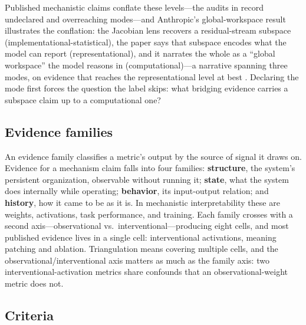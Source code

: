 \documentclass{article}
\begin{document}
Published mechanistic claims conflate these levels---the audits in  record undeclared and overreaching modes---and Anthropic's global-workspace result illustrates the conflation: the Jacobian lens recovers a residual-stream subspace (implementational-statistical), the paper says that subspace encodes what the model can report (representational), and it narrates the whole as a ``global workspace'' the model reasons in (computational)---a narrative spanning three modes, on evidence that reaches the representational level at best \citep{gurnee2026verbalizable}. Declaring the mode first forces the question the label skips: what bridging evidence carries a subspace claim up to a computational one?

\subsection{Evidence families}
\label{sec:evidence-families}

An evidence family classifies a metric's output by the source of signal it draws on. Evidence for a mechanism claim falls into four families: \textbf{structure}, the system's persistent organization, observable without running it; \textbf{state}, what the system does internally while operating; \textbf{behavior}, its input-output relation; and \textbf{history}, how it came to be as it is. In mechanistic interpretability these are weights, activations, task performance, and training. Each family crosses with a second axis---observational vs.\ interventional---producing eight cells, and most published evidence lives in a single cell: interventional activations, meaning patching and ablation. Triangulation means covering multiple cells, and the observational/interventional axis matters as much as the family axis: two interventional-activation metrics share confounds that an observational-weight metric does not.

\subsection{Criteria}
\label{sec:criteria}
\end{document}
